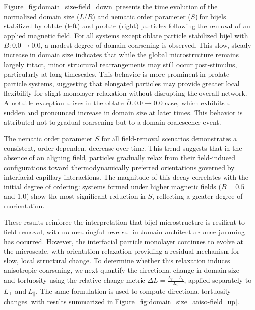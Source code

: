 Figure~\ref{fig:domain_size-field_down} presents the time evolution of the normalized domain size (\(L/R\)) and nematic 
order parameter (\(S\)) for bijels stabilized by oblate (left) and prolate (right) particles following the removal of an 
applied magnetic field. For all systems except oblate particle stabilized bijel with \(\bar{B}: 0.0 \rightarrow 0.0\), 
a modest degree of domain coarsening is observed. This slow, steady increase in domain size indicates that while the 
global microstructure remains largely intact, minor structural rearrangements may still occur post-stimulus, particularly 
at long timescales. This behavior is more prominent in prolate particle systems, suggesting that elongated particles 
may provide greater local flexibility for slight monolayer relaxation without disrupting the overall network.
A notable exception arises in the oblate \(\bar{B}: 0.0 \rightarrow 0.0\) case, which exhibits a sudden and pronounced 
increase in domain size at later times. This behavior is attributed not to gradual coarsening but to a domain coalescence 
event.

The nematic order parameter \(S\) for all field-removal scenarios demonstrates a consistent, order-dependent decrease over 
time. This trend suggests that in the absence of an aligning field, particles gradually relax from their field-induced 
configurations toward thermodynamically preferred orientations governed by interfacial capillary interactions. The 
magnitude of this decay correlates with the initial degree of ordering: systems formed under higher magnetic fields 
(\(\bar{B} = 0.5\) and \(1.0\)) show the most significant reduction in \(S\), reflecting a greater degree of reorientation.

These results reinforce the interpretation that bijel microstructure is resilient to field removal, with no meaningful 
reversal in domain architecture once jamming has occurred. However, the interfacial particle monolayer continues to evolve 
at the microscale, with orientation relaxation providing a residual mechanism for slow, local structural change. To determine 
whether this relaxation induces anisotropic coarsening, we next quantify the directional change in domain size and tortuosity 
using the relative change metric \(\Delta L = \frac{L_f - L_i}{L_i}\), applied separately to \(L_\perp\) and \(L_\parallel\). 
The same formulation is used to compute directional tortuosity changes, with results summarized in 
Figure~\ref{fig:domain_size_aniso-field_up}.

